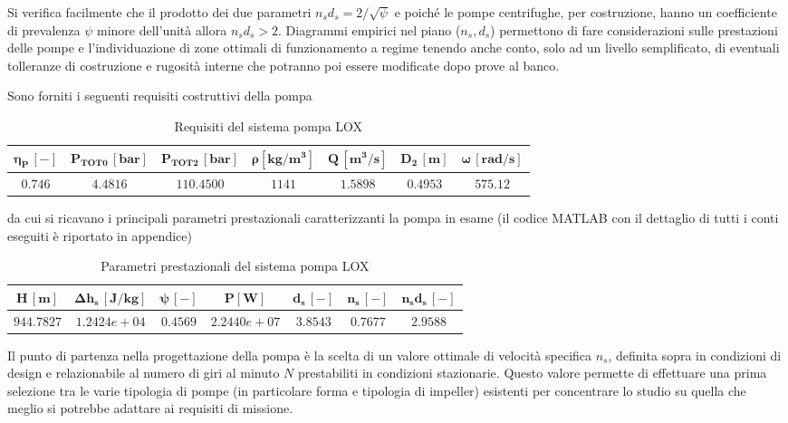 Si verifica facilmente che il prodotto dei due parametri $n_s d_s = {2}/{\sqrt\psi}$  e poiché le pompe centrifughe, per costruzione, hanno un coefficiente di prevalenza $\psi$ minore dell’unità allora $n_s d_s > 2$. Diagrammi empirici nel piano ($n_s, d_s$) permettono di fare considerazioni sulle prestazioni delle pompe e l’individuazione di zone ottimali di funzionamento a regime tenendo anche conto, solo ad un livello semplificato, di eventuali tolleranze di costruzione e rugosità interne che potranno poi essere modificate dopo prove al banco.

Sono forniti i seguenti requisiti costruttivi della pompa \cite{turbopump_manual}
\begin{table}[H]
\centering
\begin{tabular}{|c|c|c|c|c|c|c|}
\hline
$\bm{\eta_P \, [-]}$ & $\bm{P_ {TOT0} \, [bar]}$ & $\bm{P_{TOT2} \, [bar]}$ & $\bm{\rho [kg/m^3]}$ & $\bm{Q \, [m^3/s]}$ & $\bm{D_2 \, [m]}$ & $\bm{\omega \, [rad/s]}$  \\
\hline
$0.746$ & $4.4816$ & $110.4500$ &  $1141$ & $1.5898$ & $0.4953$ & $575.12$  \\
\hline
\end{tabular}

\caption{Requisiti del sistema pompa LOX}
\label{table:LOX pump specs}

\end{table}

da cui si ricavano i principali parametri prestazionali caratterizzanti la pompa in esame (il codice MATLAB con il dettaglio di tutti i conti eseguiti è riportato in appendice)

\begin{table}[H]
\centering
\begin{tabular}{|c|c|c|c|c|c|c|}
\hline
$\bm{H \, [m]}$ & $\bm{\Delta h_s \, [J/kg]}$ & $\bm{\psi \, [-]}$ & $\bm{P [W]}$ & $\bm{d_s \, [-]}$ & $\bm{n_s \, [-]}$ & $\bm{n_s d_s \, [-]}$  \\
\hline
$944.7827$ & $1.2424e+04$ & $0.4569$ &  $2.2440e+07$ & $3.8543$ & $0.7677$ & $2.9588$  \\
\hline
\end{tabular}

\caption{Parametri prestazionali del sistema pompa LOX}
\label{table:LOX pump performance}

\end{table}

Il punto di partenza nella progettazione della pompa è la scelta di un valore ottimale di velocità specifica $n_s$, definita sopra in condizioni di design e relazionabile al numero di giri al minuto $N$ prestabiliti in condizioni stazionarie. Questo valore permette di effettuare una prima selezione tra le varie tipologia di pompe (in particolare forma e tipologia di impeller) esistenti per concentrare lo studio su quella che meglio si potrebbe adattare ai requisiti di missione.
 \\

